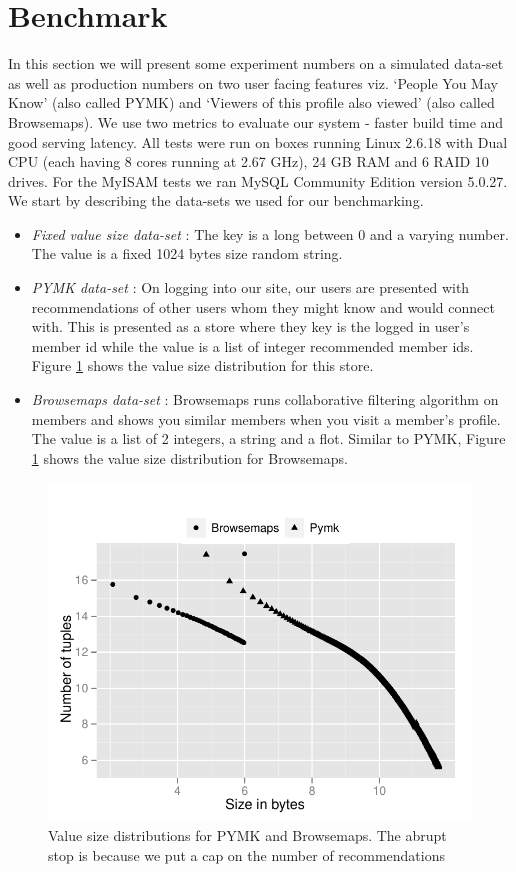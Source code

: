 \section{Benchmark}
\label{sec:benchmark}

In this section we will present some experiment numbers on a simulated data-set as well as production numbers on two user facing features viz. `People You May Know' (also called PYMK) and `Viewers of this profile also viewed' (also called Browsemaps). We use two metrics to evaluate our system - faster build time and good serving latency. All tests were run on boxes running Linux 2.6.18 with Dual CPU (each having 8 cores running at 2.67 GHz), 24 GB RAM and 6 RAID 10 drives. For the MyISAM tests we ran MySQL Community Edition version 5.0.27. We start by describing the data-sets we used for our benchmarking. 

\begin{itemize}
	\item \emph{Fixed value size data-set} : The key is a long between 0 and a varying number. The value is a fixed 1024 bytes size random string. 
	\item \emph{PYMK data-set} : On logging into our site, our users are presented with recommendations of other users whom they might know and would connect with. This is presented as a store where they key is the logged in user's member id while the value is a list of integer recommended member ids. Figure \ref{distribution} shows the value size distribution for this store. 
	\item \emph{Browsemaps data-set} : Browsemaps runs collaborative filtering algorithm on members and shows you similar members when you visit a member's profile. The value is a list of 2 integers, a string and a flot. Similar to PYMK, Figure \ref{distribution} shows the value size distribution for Browsemaps. 
\end{itemize}

\begin{figure}
  \centering
    \includegraphics[scale=0.55]{images/data_distribution.pdf}
  \caption{Value size distributions for PYMK and Browsemaps. The abrupt stop is because we put a cap on the number of recommendations}
  \label{distribution}
\end{figure}

